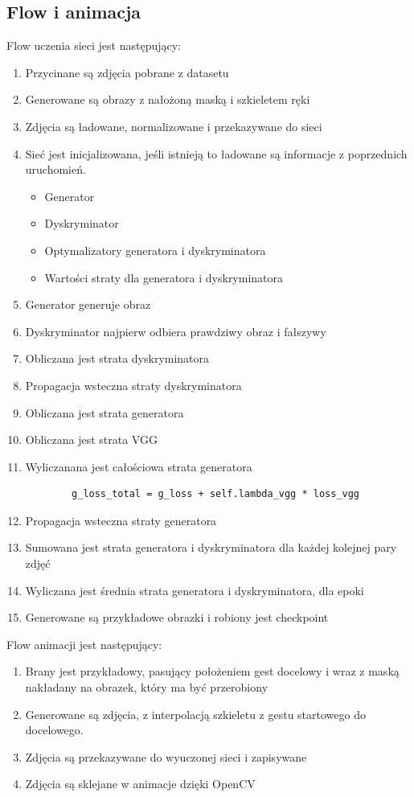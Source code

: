 \documentclass[12pt]{article}
\begin{document}
\begin{sloppypar}
{  \subsection{Flow i animacja}
  {
    Flow uczenia sieci jest następujący:
    \begin{enumerate}
      \item Przycinane są zdjęcia pobrane z datasetu \cite{nuzhdin2024hagridv21mimagesstatic}
      \item Generowane są obrazy z nałożoną maską i szkieletem ręki
      \item Zdjęcia są ładowane, normalizowane i przekazywane do sieci
      \item Sieć jest inicjalizowana, jeśli istnieją to ładowane są informacje z poprzednich uruchomień.
      \begin{itemize}
        \item Generator
        \item Dyskryminator
        \item Optymalizatory generatora i dyskryminatora
        \item Wartości straty dla generatora i dyskryminatora
      \end{itemize}
      \item Generator generuje obraz
      \item Dyskryminator najpierw odbiera prawdziwy obraz i fałszywy
      \item Obliczana jest strata dyskryminatora
      \item Propagacja wsteczna straty dyskryminatora
      \item Obliczana jest strata generatora
      \item Obliczana jest strata VGG
      \item Wyliczanana jest całościowa strata generatora
      \begin{lstlisting}
        g_loss_total = g_loss + self.lambda_vgg * loss_vgg
      \end{lstlisting}
      \item Propagacja wsteczna straty generatora
      \item Sumowana jest strata generatora i dyskryminatora dla każdej kolejnej pary zdjęć
      \item Wyliczana jest średnia strata generatora i dyskryminatora, dla epoki
      \item Generowane są przykładowe obrazki i robiony jest checkpoint
    \end{enumerate}
    Flow animacji jest następujący:
    \begin{enumerate}
      \item Brany jest przykładowy, pasujący położeniem gest docelowy i wraz z maską nakładany na obrazek, który ma być przerobiony
      \item Generowane są zdjęcia, z interpolacją szkieletu z gestu startowego do docelowego.
      \item Zdjęcia są przekazywane do wyuczonej sieci i zapisywane
      \item Zdjęcia są sklejane w animacje dzięki OpenCV
    \end{enumerate}
  }
}


\end{sloppypar}
\end{document}

